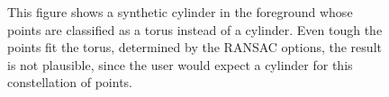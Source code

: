 \begin{figure}
\centering
{}%
{}    

  
\caption{This figure shows a synthetic cylinder in the foreground whose points are classified as a torus instead of a cylinder. Even tough the points fit the torus, determined by the RANSAC options, the result is not plausible, since the user would expect a cylinder for this constellation of points. }
\label{fig:missfittedTorus}
\end{figure}



